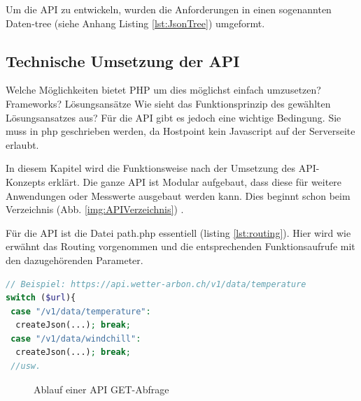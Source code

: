 Um die API zu entwickeln, wurden die Anforderungen in einen sogenannten Daten-tree (siehe Anhang Listing \ref{lst:JsonTree}) umgeformt.

\subsection{Technische Umsetzung der API}
Welche Möglichkeiten bietet PHP um dies möglichst einfach umzusetzen? Frameworks? Lösungsansätze
Wie sieht das Funktionsprinzip des gewählten Lösungsansatzes aus?
 Für die API gibt es jedoch eine wichtige Bedingung. Sie muss in php geschrieben werden, da Hostpoint kein Javascript auf der Serverseite erlaubt.



In diesem Kapitel wird die Funktionsweise nach der Umsetzung des API-Konzepts erklärt. Die ganze API ist Modular aufgebaut, dass diese für weitere Anwendungen oder Messwerte ausgebaut werden kann. Dies beginnt schon beim Verzeichnis (Abb. \ref{img:APIVerzeichnis}) .

Für die API ist die Datei path.php essentiell (listing \ref{lst:routing}). Hier wird wie erwähnt das Routing vorgenommen und die entsprechenden Funktionsaufrufe mit den dazugehörenden Parameter.

\vspace{3mm}
\begin{lstlisting}[label=lst:routing,caption=Routing der URL auf die richtige DB-Abfrage, language=php, style=php]
// Beispiel: https://api.wetter-arbon.ch/v1/data/temperature
switch ($url){
 case "/v1/data/temperature":
  createJson(...); break;
 case "/v1/data/windchill":
  createJson(...); break;
 //usw.
\end{lstlisting}
\vspace{3mm}

\begin{figure}[h!]
	\centering
	\caption{Ablauf einer API GET-Abfrage}
	\label{img:APIFiles}
\end{figure}



